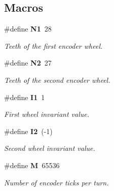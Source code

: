 \subsection*{Macros}
\begin{DoxyCompactItemize}
\item 
\mbox{\label{utils_8c_abd7b39be02bc15d79b73e5cf2b531299}} 
\#define \textbf{ N1}~28
\begin{DoxyCompactList}\small\item\em Teeth of the first encoder wheel. \end{DoxyCompactList}\item 
\mbox{\label{utils_8c_acd864640121c7df2c19f61f7baa507e4}} 
\#define \textbf{ N2}~27
\begin{DoxyCompactList}\small\item\em Teeth of the second encoder wheel. \end{DoxyCompactList}\item 
\mbox{\label{utils_8c_ae7dee1f3e548d0fefe0f67c994de03e4}} 
\#define \textbf{ I1}~1
\begin{DoxyCompactList}\small\item\em First wheel invariant value. \end{DoxyCompactList}\item 
\mbox{\label{utils_8c_a964f933e75944a909cc698a3997c8f14}} 
\#define \textbf{ I2}~(-\/1)
\begin{DoxyCompactList}\small\item\em Second wheel invariant value. \end{DoxyCompactList}\item 
\mbox{\label{utils_8c_a52037c938e3c1b126c6277da5ca689d0}} 
\#define \textbf{ M}~65536
\begin{DoxyCompactList}\small\item\em Number of encoder ticks per turn. \end{DoxyCompactList}\end{DoxyCompactItemize}
